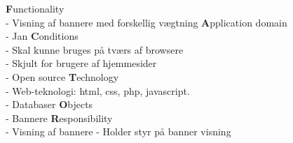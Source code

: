 \documentclass[a4paper,12pt]{article}
\begin{document}
\large{\bf{F}}\normalsize{unctionality
\\
- Visning af bannere med forskellig vægtning}
\newline
\newline
\large{\bf{A}}\normalsize{pplication domain
\\
- Jan}
\newline
\newline
\large{\bf{C}}\normalsize{onditions\\
- Skal kunne bruges på tværs af browsere\\
- Skjult for brugere af hjemmesider\\
- Open source}
\newline
\newline
\large{\bf{T}}\normalsize{echnology\\
- Web-teknologi: html, css, php, javascript.\\
- Databaser}
\newline
\newline
\large{\bf{O}}\normalsize{bjects\\
- Bannere}
\newline
\newline
\large{\bf{R}}\normalsize{esponsibility\\
- Visning af bannere
- Holder styr på banner visning}

\newpage
\end{document}
